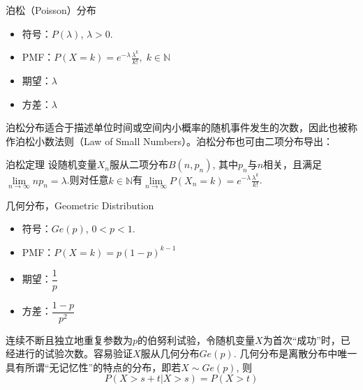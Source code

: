 \begin{frame}

\begin{block}{泊松（Poisson）分布}
\begin{itemize}
\item 符号：$P(\lambda)$, \; $\lambda > 0$.
\item PMF：$P(X = k) = e^{-\lambda}\frac{\lambda^k}{k!}, \; k \in \mathbb{N}$
\item 期望：$\lambda$
\item 方差：$\lambda$
\end{itemize}
\end{block}

\pause

泊松分布适合于描述单位时间或空间内小概率的随机事件发生的次数，因此也被称作泊松小数法则（Law of Small Numbers）。泊松分布也可由二项分布导出：

\begin{block}{泊松定理}
设随机变量$X_n$服从二项分布$B(n,p_n)$, 其中$p_n$与$n$相关，且满足$\lim\limits_{n\to\infty} np_n = \lambda$.则对任意$k \in \mathbb{N}$有$\lim\limits_{n\to\infty} P(X_n = k) = e^{-\lambda}\frac{\lambda^k}{k!}$.
\end{block}

\end{frame}


\begin{frame}

\begin{block}{几何分布，Geometric Distribution}
\begin{itemize}
\item 符号：$Ge(p)$, \; $0 < p < 1$.
\item PMF：$P(X = k) = p(1-p)^{k-1}$
\item 期望：$\dfrac{1}{p}$
\item 方差：$\dfrac{1-p}{p^2}$
\end{itemize}

\vspace{1em}
\pause

连续不断且独立地重复参数为$p$的伯努利试验，令随机变量$X$为首次``成功''时，已经进行的试验次数。容易验证$X$服从几何分布$Ge(p)$. 几何分布是离散分布中唯一具有所谓``无记忆性''的特点的分布，即若$X\sim Ge(p)$, 则
\[P(X>s+t | X>s) = P(X>t)\]
\end{block}

\end{frame}

